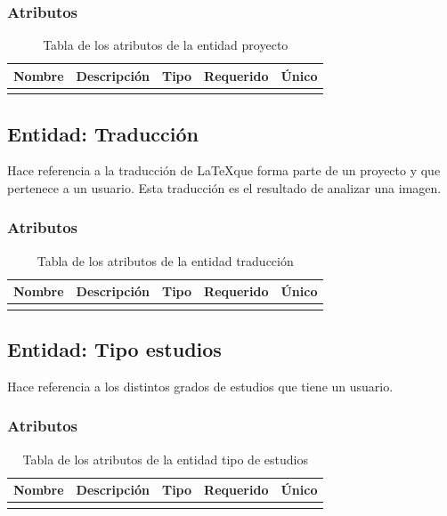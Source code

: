 \subsubsection{Atributos}
\begin{center}
	\begin{longtable}{|J{4cm}|J{4cm}|J{3cm}|J{2cm}|J{2cm}|}
		\hline
		\textbf{Nombre} & \textbf{Descripción} & \textbf{Tipo} & \textbf{Requerido} & \textbf{Único} \\ \hline
		\caption{Tabla de los atributos de la entidad proyecto}
		\label{tbl:entidad-proyecto}
	\end{longtable}
\end{center}
\subsection{Entidad: Traducción}
Hace referencia a la traducción de \LaTeX que forma parte de un proyecto y que pertenece a un usuario. Esta traducción es el resultado de analizar una imagen.
\subsubsection{Atributos}
\begin{center}
	\begin{longtable}{|J{4cm}|J{4cm}|J{3cm}|J{2cm}|J{2cm}|}
		\hline
		\textbf{Nombre} & \textbf{Descripción} & \textbf{Tipo} & \textbf{Requerido} & \textbf{Único} \\ \hline
		\caption{Tabla de los atributos de la entidad traducción}
		\label{tbl:entidad-traduccion}
	\end{longtable}
\end{center}
\subsection{Entidad: Tipo estudios}
Hace referencia a los distintos grados de estudios que tiene un usuario.
\subsubsection{Atributos}
\begin{center}
	\begin{longtable}{|J{4cm}|J{4cm}|J{3cm}|J{2cm}|J{2cm}|}
		\hline
		\textbf{Nombre} & \textbf{Descripción} & \textbf{Tipo} & \textbf{Requerido} & \textbf{Único} \\ \hline
		\caption{Tabla de los atributos de la entidad tipo de estudios}
		\label{tbl:entidad-tipo-estudios}
	\end{longtable}
\end{center}
